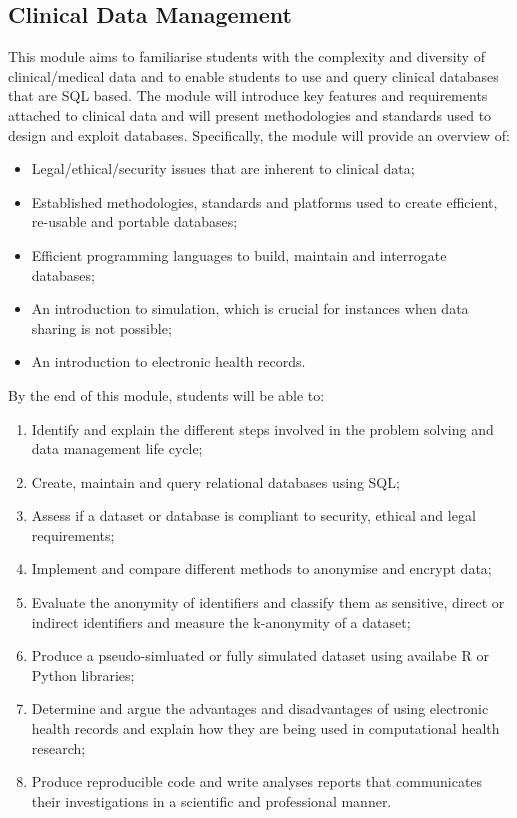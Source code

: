 \documentclass[
]{book}
\providecommand{\tightlist}{%
  \setlength{\itemsep}{0pt}\setlength{\parskip}{0pt}}
\begin{document}
\subsection*{Clinical Data Management}\label{clinical-data-management}

This module aims to familiarise students with the complexity and diversity of clinical/medical data and to enable students to use and query clinical databases that are SQL based. The module will introduce key features and requirements attached to clinical data and will present methodologies and standards used to design and exploit databases. Specifically, the module will provide an overview of:

\begin{itemize}
\tightlist
\item
  Legal/ethical/security issues that are inherent to clinical data;
\item
  Established methodologies, standards and platforms used to create efficient, re-usable and portable databases;
\item
  Efficient programming languages to build, maintain and interrogate databases;
\item
  An introduction to simulation, which is crucial for instances when data sharing is not possible;
\item
  An introduction to electronic health records.
\end{itemize}

By the end of this module, students will be able to:

\begin{enumerate}
\def\labelenumi{\arabic{enumi}.}
\tightlist
\item
  Identify and explain the different steps involved in the problem solving and data management life cycle;
\item
  Create, maintain and query relational databases using SQL;
\item
  Assess if a dataset or database is compliant to security, ethical and legal requirements;
\item
  Implement and compare different methods to anonymise and encrypt data;
\item
  Evaluate the anonymity of identifiers and classify them as sensitive, direct or indirect identifiers and measure the k-anonymity of a dataset;
\item
  Produce a pseudo-simluated or fully simulated dataset using availabe R or Python libraries;
\item
  Determine and argue the advantages and disadvantages of using electronic health records and explain how they are being used in computational health research;
\item
  Produce reproducible code and write analyses reports that communicates their investigations in a scientific and professional manner.
\end{enumerate}
\end{document}
